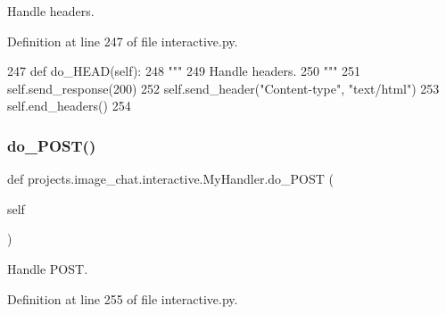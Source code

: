 \begin{DoxyVerb}Handle headers.
\end{DoxyVerb}
 

Definition at line 247 of file interactive.\+py.


\begin{DoxyCode}
247     \textcolor{keyword}{def }do\_HEAD(self):
248         \textcolor{stringliteral}{"""}
249 \textcolor{stringliteral}{        Handle headers.}
250 \textcolor{stringliteral}{        """}
251         self.send\_response(200)
252         self.send\_header(\textcolor{stringliteral}{"Content-type"}, \textcolor{stringliteral}{"text/html"})
253         self.end\_headers()
254 
\end{DoxyCode}
\mbox{\label{classprojects_1_1image__chat_1_1interactive_1_1MyHandler_a7dcb1ea02322e970240bd16b605096fd}} 
\subsubsection{\texorpdfstring{do\+\_\+\+P\+O\+S\+T()}{do\_POST()}}
{\footnotesize\ttfamily def projects.\+image\+\_\+chat.\+interactive.\+My\+Handler.\+do\+\_\+\+P\+O\+ST (\begin{DoxyParamCaption}\item[{}]{self }\end{DoxyParamCaption})}

\begin{DoxyVerb}Handle POST.
\end{DoxyVerb}
 

Definition at line 255 of file interactive.\+py.


